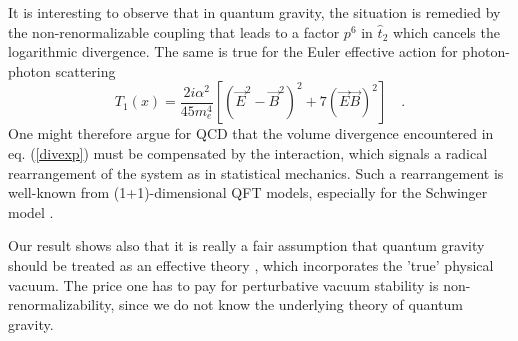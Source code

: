 \documentclass[a4paper,11pt]{article}
\begin{document}
It is interesting to observe
that in quantum gravity, the situation is remedied by
the non-renormalizable coupling that leads to a factor $p^6$
in $\hat{t}_2$ which cancels
the logarithmic divergence. The same is true for the Euler effective
action for photon-photon scattering
\begin{equation}
T_1(x)=\frac{2i\alpha^2}{45m_e^4}[(\vec{E}^2-\vec{B}^2)^2+7(\vec{E}
\vec{B})^2] \quad .
\end{equation}
One might therefore argue for QCD that the volume divergence encountered in
eq. (\ref{divexp})
must be compensated by the interaction, which signals a radical rearrangement
of the system as in statistical mechanics. Such a rearrangement is
well-known from (1+1)-dimensional QFT models, especially for the
Schwinger model \cite{schw1,schw2,schw3}.

Our result shows also that it is really a fair
assumption that quantum gravity should be treated as
an effective theory \cite{donoghue}, which incorporates the 'true'
physical vacuum. The price one has to pay for perturbative vacuum stability
is non-renormalizability,
since we do not know the underlying theory of quantum gravity.
\end{document}
